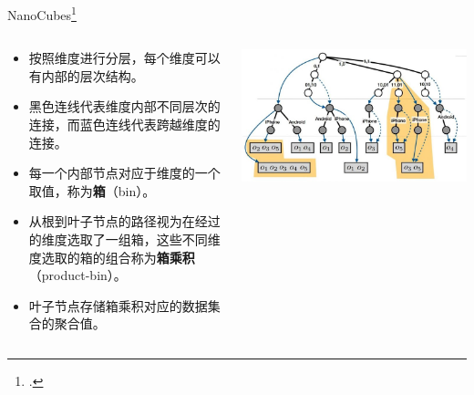 \documentclass[10pt,aspectratio=169]{beamer}
\begin{document}
\begin{frame}{NanoCubes\footcite{Lins2013}}
    \begin{columns}
        \begin{column}{.65\textwidth}
            \begin{itemize}[<+->]
                \item 按照维度进行分层，每个维度可以有内部的层次结构。
                \item 黑色连线代表维度内部不同层次的连接，而蓝色连线代表跨越维度的连接。
                \item 每一个内部节点对应于维度的一个取值，称为\textbf{箱}（bin）。
                \item 从根到叶子节点的路径视为在经过的维度选取了一组箱，这些不同维度选取的箱的组合称为\textbf{箱乘积}（product-bin）。
                \item 叶子节点存储箱乘积对应的数据集合的聚合值。
            \end{itemize}
        \end{column}

        \begin{column}{.35\textwidth}
            \includegraphics[width=\textwidth]{pic/nanocubes.jpg}
        \end{column}

    \end{columns}
\end{frame}
\end{document}
